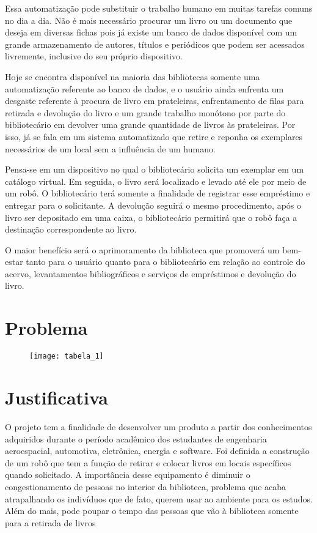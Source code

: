 Essa automatização pode substituir o trabalho humano em muitas tarefas comuns no dia a dia. Não é mais necessário procurar um livro ou um documento que deseja em diversas fichas pois já existe um banco de dados disponível com um grande armazenamento de autores, títulos e periódicos que podem ser acessados livremente, inclusive do seu próprio dispositivo.

Hoje se encontra disponível na maioria das bibliotecas somente uma automatização referente ao banco de dados, e o usuário ainda enfrenta um desgaste referente à procura de livro em prateleiras, enfrentamento de filas para retirada e devolução do livro e um grande trabalho monótono por parte do bibliotecário em devolver uma grande quantidade de livros às prateleiras. Por isso, já se fala em um sistema automatizado que retire e reponha os exemplares necessários de um local sem a influência de um humano. 

Pensa-se em um dispositivo no qual o bibliotecário solicita um exemplar em um catálogo virtual. Em seguida, o livro será localizado e levado até ele por meio de um robô. O bibliotecário terá somente a finalidade de registrar esse empréstimo e entregar para o solicitante.  A devolução seguirá o mesmo procedimento, após o livro ser depositado em uma caixa, o bibliotecário permitirá que o robô faça a destinação correspondente ao livro.

O maior benefício será o aprimoramento da biblioteca que promoverá um bem-estar tanto para o usuário quanto para o bibliotecário em relação ao controle do acervo, levantamentos bibliográficos e serviços de empréstimos e devolução do livro. 

\section{Problema}

\begin{figure}
\centering 
\texttt{[image: tabela\_1]}
\end{figure}

\section{Justificativa}
O projeto tem a finalidade de desenvolver um produto a partir dos conhecimentos adquiridos durante o período acadêmico dos estudantes de engenharia aeroespacial, automotiva, eletrônica, energia e software. Foi definida a construção de um robô que tem a função de retirar e colocar livros em locais específicos quando solicitado. A importância desse equipamento é diminuir o congestionamento de pessoas no interior da biblioteca, problema que acaba atrapalhando os indivíduos que de fato, querem usar ao ambiente para os estudos.  Além do mais, pode poupar o tempo das pessoas que vão à biblioteca somente para a retirada de livros

